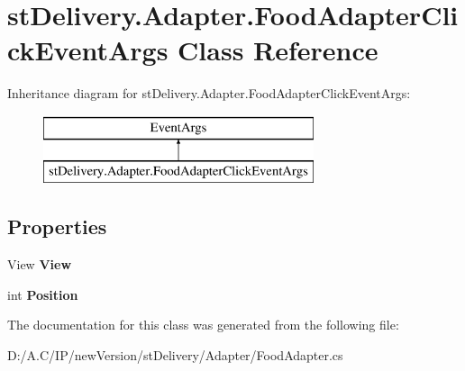 \hypertarget{classst_delivery_1_1_adapter_1_1_food_adapter_click_event_args}{}\section{st\+Delivery.\+Adapter.\+Food\+Adapter\+Click\+Event\+Args Class Reference}
\label{classst_delivery_1_1_adapter_1_1_food_adapter_click_event_args}
Inheritance diagram for st\+Delivery.\+Adapter.\+Food\+Adapter\+Click\+Event\+Args\+:\begin{figure}[H]
\begin{center}
\leavevmode
\includegraphics[height=2.000000cm]{classst_delivery_1_1_adapter_1_1_food_adapter_click_event_args}
\end{center}
\end{figure}
\subsection*{Properties}
\begin{DoxyCompactItemize}
\item 
\mbox{\label{classst_delivery_1_1_adapter_1_1_food_adapter_click_event_args_a26d1c28b5e394631edbfb03aa4543b8f}} 
View {\bfseries View}
\item 
\mbox{\label{classst_delivery_1_1_adapter_1_1_food_adapter_click_event_args_ae8b1922af08bfe2e98e2afff0d67b4d7}} 
int {\bfseries Position}
\end{DoxyCompactItemize}


The documentation for this class was generated from the following file\+:\begin{DoxyCompactItemize}
\item 
D\+:/\+A.\+C/\+I\+P/new\+Version/st\+Delivery/\+Adapter/Food\+Adapter.\+cs\end{DoxyCompactItemize}
